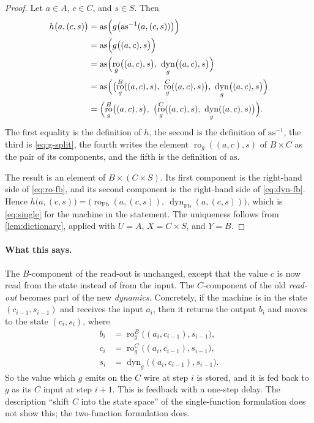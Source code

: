 \documentclass[11pt,a4paper]{article}
\theoremstyle{plain}
\theoremstyle{remark}
\DeclareMathOperator{\dyn}{dyn}
\DeclareMathOperator{\ro}{ro}
\DeclareMathOperator{\Fb}{Fb}
\newcommand{\as}{\mathrm{as}}
\begin{document}
\begin{proof}
    Let $a \in A$, $c \in C$, and $s \in S$.
    Then
    \begin{align*}
        h\bigl(a, (c, s)\bigr)
         & = \as\Bigl(g\bigl(\as^{-1}(a, (c, s))\bigr)\Bigr) \\
         & = \as\Bigl(g\bigl((a, c), s\bigr)\Bigr) \\
         & = \as\Bigl(\ro_g\bigl((a, c), s\bigr),\ \dyn_g\bigl((a, c), s\bigr)\Bigr) \\
         & = \as\Bigl(\bigl(\ro_g^{B}((a, c), s),\ \ro_g^{C}((a, c), s)\bigr),\ \dyn_g\bigl((a, c), s\bigr)\Bigr) \\
         & = \Bigl(\ro_g^{B}\bigl((a, c), s\bigr),\ \bigl(\ro_g^{C}((a, c), s),\ \dyn_g((a, c), s)\bigr)\Bigr).
    \end{align*}
    The first equality is the definition of $h$, the second is the definition of $\as^{-1}$, the third is \cref{eq:g-split}, the fourth writes the element $\ro_g((a, c), s)$ of $B \times C$ as the pair of its components, and the fifth is the definition of $\as$.

    The result is an element of $B \times (C \times S)$.
    Its first component is the right-hand side of \cref{eq:ro-fb}, and its second component is the right-hand side of \cref{eq:dyn-fb}.
    Hence $h\bigl(a, (c, s)\bigr) = \bigl(\ro_{\Fb}(a, (c, s)),\ \dyn_{\Fb}(a, (c, s))\bigr)$, which is \cref{eq:single} for the machine in the statement.
    The uniqueness follows from \cref{lem:dictionary}, applied with $U = A$, $X = C \times S$, and $Y = B$.
\end{proof}

\paragraph{What this says.}
The $B$-component of the read-out is unchanged, except that the value $c$ is now read from the state instead of from the input.
The $C$-component of the old \emph{read-out} becomes part of the new \emph{dynamics}.
Concretely, if the machine is in the state $(c_{i-1}, s_{i-1})$ and receives the input $a_i$, then it returns the output $b_i$ and moves to the state $(c_i, s_i)$, where
\begin{equation}
    \begin{aligned}
        b_i & = \ro_g^{B}\bigl((a_i, c_{i-1}), s_{i-1}\bigr), \\
        c_i & = \ro_g^{C}\bigl((a_i, c_{i-1}), s_{i-1}\bigr), \\
        s_i & = \dyn_g\bigl((a_i, c_{i-1}), s_{i-1}\bigr).
    \end{aligned}
\end{equation}
So the value which $g$ emits on the $C$ wire at step $i$ is stored, and it is fed back to $g$ as its $C$ input at step $i + 1$.
This is feedback with a one-step delay.
The description ``shift $C$ into the state space'' of the single-function formulation does not show this; the two-function formulation does.
\end{document}
